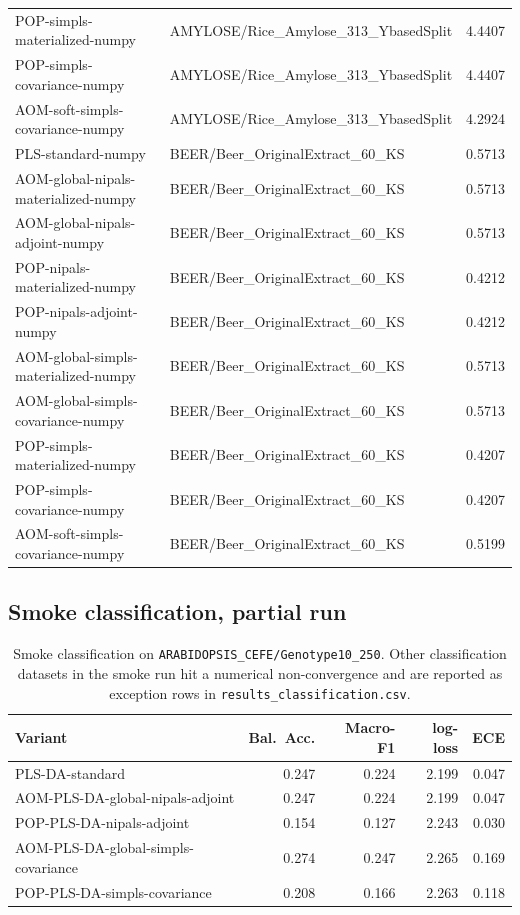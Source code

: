 \documentclass[a4paper,11pt]{article}
\begin{document}
\begin{longtable}{lll}
POP-simpls-materialized-numpy & AMYLOSE/Rice\_Amylose\_313\_YbasedSplit & 4.4407 \\
POP-simpls-covariance-numpy & AMYLOSE/Rice\_Amylose\_313\_YbasedSplit & 4.4407 \\
AOM-soft-simpls-covariance-numpy & AMYLOSE/Rice\_Amylose\_313\_YbasedSplit & 4.2924 \\
PLS-standard-numpy & BEER/Beer\_OriginalExtract\_60\_KS & 0.5713 \\
AOM-global-nipals-materialized-numpy & BEER/Beer\_OriginalExtract\_60\_KS & 0.5713 \\
AOM-global-nipals-adjoint-numpy & BEER/Beer\_OriginalExtract\_60\_KS & 0.5713 \\
POP-nipals-materialized-numpy & BEER/Beer\_OriginalExtract\_60\_KS & 0.4212 \\
POP-nipals-adjoint-numpy & BEER/Beer\_OriginalExtract\_60\_KS & 0.4212 \\
AOM-global-simpls-materialized-numpy & BEER/Beer\_OriginalExtract\_60\_KS & 0.5713 \\
AOM-global-simpls-covariance-numpy & BEER/Beer\_OriginalExtract\_60\_KS & 0.5713 \\
POP-simpls-materialized-numpy & BEER/Beer\_OriginalExtract\_60\_KS & 0.4207 \\
POP-simpls-covariance-numpy & BEER/Beer\_OriginalExtract\_60\_KS & 0.4207 \\
AOM-soft-simpls-covariance-numpy & BEER/Beer\_OriginalExtract\_60\_KS & 0.5199 \\
\end{longtable}

\subsection{Smoke classification, partial run}
\begin{table}[h]
\centering
\caption{Smoke classification on \texttt{ARABIDOPSIS\_CEFE/Genotype10\_250}. Other
classification datasets in the smoke run hit a numerical
non-convergence and are reported as exception rows in
\texttt{results\_classification.csv}.}
\begin{tabular}{lrrrr}
\toprule
Variant & Bal.\ Acc. & Macro-F1 & log-loss & ECE \\
\midrule
PLS-DA-standard & 0.247 & 0.224 & 2.199 & 0.047 \\
AOM-PLS-DA-global-nipals-adjoint & 0.247 & 0.224 & 2.199 & 0.047 \\
POP-PLS-DA-nipals-adjoint & 0.154 & 0.127 & 2.243 & 0.030 \\
AOM-PLS-DA-global-simpls-covariance & 0.274 & 0.247 & 2.265 & 0.169 \\
POP-PLS-DA-simpls-covariance & 0.208 & 0.166 & 2.263 & 0.118 \\
\bottomrule
\end{tabular}
\end{table}
\end{document}
